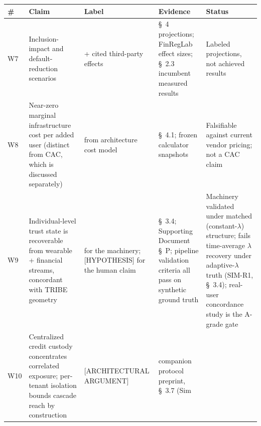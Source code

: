 \documentclass[
]{article}
\newcounter{none} %
\begin{document}
{\def\LTcaptype{none} %
\begin{longtable}[]{@{}
  >{\raggedright\arraybackslash}p{}
  >{\raggedright\arraybackslash}p{}
  >{\raggedright\arraybackslash}p{}
  >{\raggedright\arraybackslash}p{}
  >{\raggedright\arraybackslash}p{}@{}}
\toprule\noalign{}
\begin{minipage}[b]{\linewidth}\raggedright
\#
\end{minipage} & \begin{minipage}[b]{\linewidth}\raggedright
Claim
\end{minipage} & \begin{minipage}[b]{\linewidth}\raggedright
Label
\end{minipage} & \begin{minipage}[b]{\linewidth}\raggedright
Evidence
\end{minipage} & \begin{minipage}[b]{\linewidth}\raggedright
Status
\end{minipage} \\
\midrule\noalign{}
\endhead
\bottomrule\noalign{}
\endlastfoot
W7 & Inclusion-impact and default-reduction scenarios & + cited
third-party effects & §~4 projections; FinRegLab effect sizes; §~2.3
incumbent measured results & Labeled projections, not achieved
results \\
W8 & Near-zero marginal infrastructure cost per added user (distinct
from CAC, which is discussed separately) & from architecture cost model
& §~4.1; frozen calculator snapshots & Falsifiable against current
vendor pricing; not a CAC claim \\
W9 & Individual-level trust state is recoverable from wearable +
financial streams, concordant with TRIBE geometry & for the machinery;
{[}HYPOTHESIS{]} for the human claim & §~3.4; Supporting Document §~P;
pipeline validation criteria all pass on synthetic ground truth &
Machinery validated under matched (constant-\(\lambda\)) structure;
fails time-average \(\lambda\) recovery under adaptive-\(\lambda\) truth
(SIM-R1, §~3.4); real-user concordance study is the A-grade gate \\
W10 & Centralized credit custody concentrates correlated exposure;
per-tenant isolation bounds cascade reach by construction &
{[}ARCHITECTURAL ARGUMENT{]} & companion protocol preprint, §~3.7 (Sim

\end{longtable}}
\end{document}

